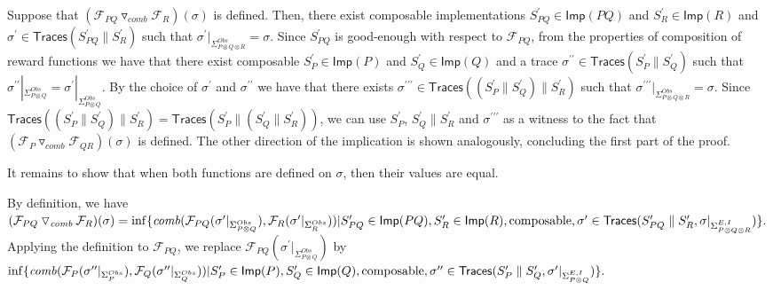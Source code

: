  
Suppose that $({{\mathcal{F}_{PQ}}\mathbin{\triangledown_{\mathit{comb}}}{\mathcal{F}_{R}}})(\sigma)$ is defined. Then, there exist composable implementations $S_{PQ}^{\prime}\in\mathsf{Imp}(PQ)$ and $S_{R}^{\prime}\in\mathsf{Imp}(R)$ and $\sigma^{\prime}\in\mathsf{Traces}(S_{PQ}^{\prime}\parallel S_{R}^{\prime})$ such that $\sigma^{\prime}|_{\Sigma_{P\otimes Q\otimes R}^{Obs}}=\sigma$. Since $S_{PQ}^{\prime}$ is good-enough with respect to $\mathcal{F}_{PQ}$, from the properties of composition of reward functions we have that there exist composable $S_{P}^{\prime}\in\mathsf{Imp}(P)$ and $S_{Q}^{\prime}\in\mathsf{Imp}(Q)$ and a trace $\sigma^{\prime\prime}\in\mathsf{Traces}(S_{P}^{\prime}\parallel S_{Q}^{\prime})$ such that $\sigma^{\prime\prime}|_{\Sigma_{P\otimes Q}^{Obs}}=\sigma^{\prime}|_{\Sigma_{P\otimes Q}^{Obs}}$. By the choice of $\sigma^{\prime}$ and $\sigma^{\prime\prime}$ we have that there exists $\sigma^{\prime\prime\prime}\in\mathsf{Traces}((S_{P}^{\prime}\parallel S_{Q}^{\prime})\parallel S_{R}^{\prime})$ such that $\sigma^{\prime\prime\prime}|_{\Sigma_{P\otimes Q\otimes R}^{Obs}}=\sigma$. Since $\mathsf{Traces}((S_{P}^{\prime}\parallel S_{Q}^{\prime})\parallel S_{R}^{\prime})=\mathsf{Traces}(S_{P}^{\prime}\parallel(S_{Q}^{\prime}\parallel S_{R}^{\prime}))$, we can use $S_{P}^{\prime}$, $S_{Q}^{\prime}\parallel S_{R}^{\prime}$ and $\sigma^{\prime\prime\prime}$ as a witness to the fact that $({{\mathcal{F}_{P}}\mathbin{\triangledown_{\mathit{comb}}}{\mathcal{F}_{QR}}})(\sigma)$ is defined. The other direction of the implication is shown analogously, concluding the first part of the proof.\par
 
 
 
It remains to show that when both functions are defined on $\sigma$, then their values are equal.\par
 
 
 
By definition, we have $({{\mathcal{F}_{PQ}}\mathbin{\triangledown_{\mathit{comb}}}{\mathcal{F}_{R}}})(\sigma)=\inf\{\mathit{comb}(\mathcal{F}_{PQ}(\sigma^{\prime}|_{\Sigma_{P\otimes Q}^{Obs}}),\mathcal{F}_{R}(\sigma^{\prime}|_{\Sigma_{R}^{Obs}}))|\\
S^{\prime}_{PQ}\in\mathsf{Imp}(PQ),S^{\prime}_{R}\in\mathsf{Imp}(R),\text{composable},\sigma^{\prime}\in\mathsf{Traces}(S^{\prime}_{PQ}\parallel S^{\prime}_{R},\sigma|_{\Sigma_{P\otimes Q\otimes R}^{E,I}})\}.$ Applying the definition to $\mathcal{F}_{PQ}$, we replace $\mathcal{F}_{PQ}(\sigma^{\prime}|_{\Sigma_{P\otimes Q}^{Obs}})$ by $\inf\{\mathit{comb}(\mathcal{F}_{P}(\sigma^{\prime\prime}|_{\Sigma_{P}^{Obs}}),\mathcal{F}_{Q}(\sigma^{\prime\prime}|_{\Sigma_{Q}^{Obs}}))|\\
S^{\prime}_{P}\in\mathsf{Imp}(P),S^{\prime}_{Q}\in\mathsf{Imp}(Q),\text{composable},\sigma^{\prime\prime}\in\mathsf{Traces}(S^{\prime}_{P}\parallel S^{\prime}_{Q},\sigma^{\prime}|_{\Sigma_{P\otimes Q}^{E,I}})\}.$\par
 
